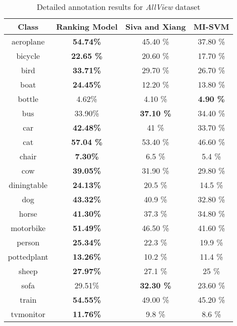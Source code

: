 \documentclass{bmvc2k}
\begin{document}
\newcommand{\tabincell}[2]{\begin{tabular}{@{}#1@{}}#2\end{tabular}}
\begin{table}
\scriptsize
\begin{center}
\begin{tabular}{|c| c|c| c|}
\hline
\textbf{Class} & \textbf{Ranking Model}  & \textbf{Siva and Xiang} \cite{Sivaiccv2011} & \textbf{MI-SVM} \cite{Andrews03supportvector}\\
\hline
aeroplane & \textbf{54.74\%}  &  45.40 \%  & 37.80 \% \\
bicycle & \textbf{22.65 \%} &  20.60 \%  & 17.70 \% \\
bird & \textbf{33.71\%} &   29.70 \%  & 26.70 \% \\
boat & \textbf{24.45\%} &   12.20 \%  & 13.80 \% \\
bottle & 4.62\% &  4.10 \%  &  \textbf{4.90 \%} \\
bus & 33.90\% &   \textbf{37.10 \%}  & 34.40 \% \\
car & \textbf{42.48\%} &   41 \%  & 33.70 \% \\
cat & \textbf{57.04 \%} &   53.40 \%  & 46.60 \% \\
chair & \textbf{7.30\%} &  6.5 \%  & 5.4 \% \\
cow & \textbf{39.05\%} &  31.90 \%  & 29.80 \% \\
diningtable & \textbf{24.13\%} &  20.5 \%  & 14.5 \% \\
dog & \textbf{43.32\%} &  40.9 \%  & 32.80 \% \\
horse & \textbf{41.30\%} &  37.3 \%  & 34.80 \% \\
motorbike & \textbf{51.49\%} &  46.50 \%  & 41.60 \% \\
person & \textbf{25.34\%} &  22.3 \%  & 19.9 \% \\
pottedplant & \textbf{13.26\%} &   10.2 \%  & 11.4 \% \\
sheep & \textbf{27.97\%} &   27.1 \%  & 25 \% \\
sofa & 29.51\% & \textbf{ 32.30 \%}  & 23.60 \% \\
train &\textbf{ 54.55\%} &   49.00 \%  & 45.20 \% \\
tvmonitor & \textbf{11.76\%} &  9.8 \%  & 8.6 \% \\
\hline

\end{tabular}
\end{center}

\caption{Detailed annotation results for \emph{AllView} dataset}
\label{results_class_ranking}
\end{table}
\end{document}
